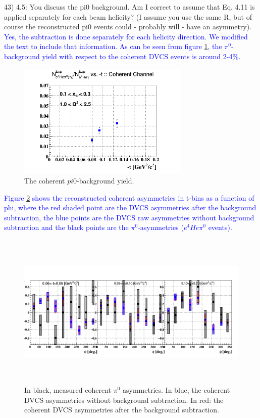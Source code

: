 43) 4.5: You discuss the pi0 background. Am I correct to assume that Eq. 4.11 
is applied separately for each beam helicity? (I assume you use the same R, but 
of course the reconstructed pi0 events could - probably will - have an 
asymmetry).   \\
\textcolor{blue}{ Yes, the subtraction is done separately for each helicity 
   direction. We modified the text to include that information. As can be seen 
   from figure \ref{fig:pi0yield}, the $\pi^0$-background yield with respect to 
   the coherent DVCS events is around 2-4$\%$.}\\
\begin{figure}[h!]
   \centering
   \includegraphics[height=5.5cm]{fig/t_ratio_coh_t.png}
   \caption{The coherent $pi0$-background yield.}
   \label{fig:pi0yield}
\end{figure}
                          
   \textcolor{blue}{
   Figure \ref{fig:coh_dvcs_pi0_Alu} shows the reconstructed coherent 
   asymmetries in t-bins as a function of phi, where the red shaded point are 
   the DVCS asymmetries after the background subtraction, the blue points are 
   the DVCS raw asymmetries without background subtraction and the black points 
   are the $\pi^0$-asymmetries ($e^{4}He\pi^{0}$ events).  }\\
\begin{figure}[h!]
   \centering
   \includegraphics[height=7.5cm]{fig/coherent_AlU_pi0.png}
   \caption{In black, measured coherent $\pi^{0}$ asymmetries. In blue, the 
   coherent DVCS asymmetries without background subtraction. In red: the 
coherent DVCS asymmetries after the background subtraction.}
   \label{fig:coh_dvcs_pi0_Alu}
    \end{figure}


